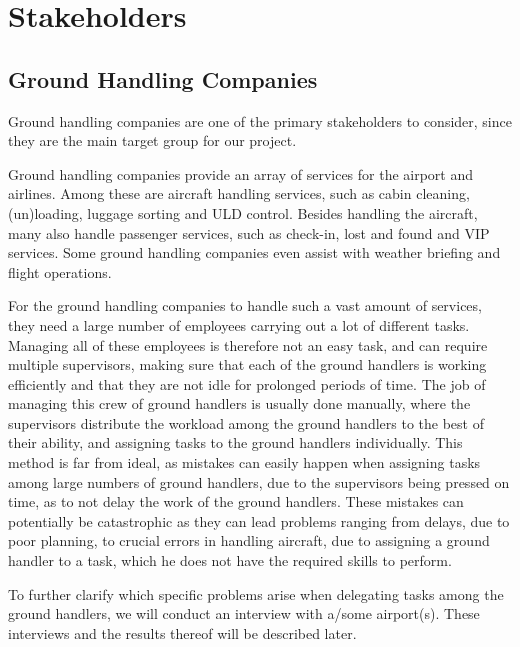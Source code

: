 \chapter{Stakeholders}
\section{Ground Handling Companies}
Ground handling companies are one of the primary stakeholders to consider, since they are the main target group for our project.

Ground handling companies provide an array of services for the airport and airlines. Among these are aircraft handling services, such as cabin cleaning, (un)loading, luggage sorting and ULD control. Besides handling the aircraft, many also handle passenger services, such as check-in, lost and found and VIP services. Some ground handling companies even assist with weather briefing and flight operations.

For the ground handling companies to handle such a vast amount of services, they need a large number of employees carrying out a lot of different tasks. Managing all of these employees is therefore not an easy task, and can require multiple supervisors, making sure that each of the ground handlers is working efficiently and that they are not idle for prolonged periods of time. The job of managing this crew of ground handlers is usually done manually, where the supervisors distribute the workload among the ground handlers to the best of their ability, and assigning tasks to the ground handlers individually.
This method is far from ideal, as mistakes can easily happen when assigning tasks among large numbers of ground handlers, due to the supervisors being pressed on time, as to not delay the work of the ground handlers. These mistakes can potentially be catastrophic as they can lead problems ranging from delays, due to poor planning, to crucial errors in handling aircraft, due to assigning a ground handler to a task, which he does not have the required skills to perform.

To further clarify which specific problems arise when delegating tasks among the ground handlers, we will conduct an interview with a/some airport(s). These interviews and the results thereof will be described later.